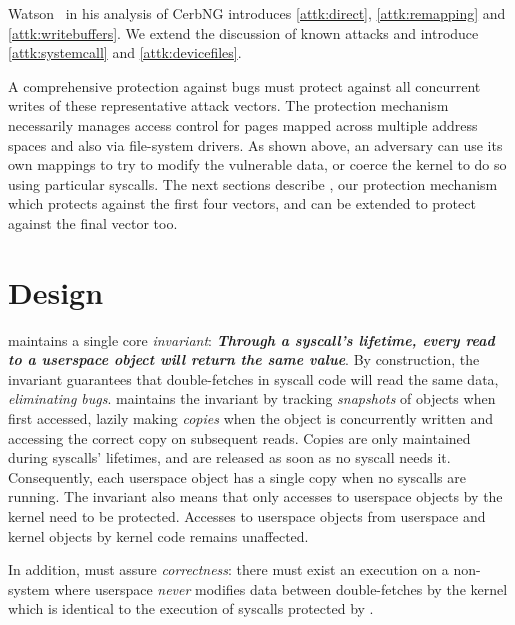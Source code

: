 \documentclass[letterpaper,twocolumn,10pt, anonymous]{article}
\begin{document}
Watson~\cite{watson2007exploiting} in his analysis of CerbNG introduces
\autoref{attk:direct}, \autoref{attk:remapping} and \autoref{attk:writebuffers}.
We extend the discussion of known attacks and introduce
\autoref{attk:systemcall} and \autoref{attk:devicefiles}.

A comprehensive protection against \tocttou bugs must protect against 
all concurrent writes of these representative attack vectors.
The protection mechanism necessarily manages access control for pages
mapped across multiple address spaces and also via file-system drivers.
As shown above, an adversary can use its own mappings to try to modify the
vulnerable data, or coerce the kernel to do so using particular syscalls.
The next sections describe \tiktok, our protection mechanism which 
protects against the first four vectors, and can be extended to protect 
against the final vector too.


\section{\tiktok Design} 
\label{sec:design}

\tiktok maintains a single core \emph{invariant}:
\textbf{\emph{Through a syscall's lifetime, every read to a userspace object 
will return the same value}}.
By construction, the invariant guarantees that double-fetches in syscall
code will read the same data, \emph{eliminating \tocttou bugs}.
\tiktok maintains the invariant by tracking \emph{snapshots} of objects
when first accessed, lazily making \emph{copies} when the object is concurrently 
written and accessing the correct copy on subsequent reads.
Copies are only maintained during syscalls' lifetimes, and are released as 
soon as no syscall needs it.
Consequently, each userspace object has a single copy when no syscalls are
running.
The invariant also means that only accesses to userspace objects by the kernel
need to be protected. 
Accesses to userspace objects from userspace and kernel objects by kernel 
code remains unaffected.

In addition, \tiktok must assure \emph{correctness}: there must exist an
execution on a non-\tiktok system where userspace \emph{never} modifies data 
between double-fetches by the kernel which is identical to the execution
of syscalls protected by \tiktok.
\end{document}
